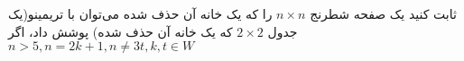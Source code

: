 \begin{PROBLEM}
	\p
	ثابت کنید یک صفحه شطرنج
	$n \times n$
	را که یک خانه آن حذف شده می‌توان با تریمینو(یک جدول
	$2 \times 2$
	که یک خانه آن حذف شده)
	پوشش داد، اگر
	$n > 5, n = 2k + 1, n \neq 3t, k, t \in W$
	\SOLUTION{
		\p
		
	}
\end{PROBLEM}